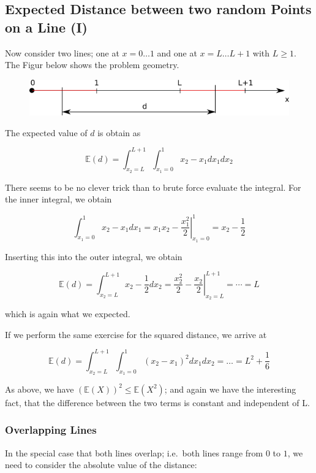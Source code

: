 \subsection{Expected Distance between two random Points on a Line
(I)}\label{expected-distance-between-two-random-points-on-a-line-i}

Now consider two lines; one at \(x=0 \ldots 1\) and one at
\(x=L \ldots L+1\) with \(L \geq 1\). The Figur below shows the problem
geometry.

\begin{figure}[H]
\centering
\includegraphics[scale=0.7]{images/expected_distances_01_02.png}
\end{figure}

The expected value of \(d\) is obtain as

\[
\mathbb{E}(d) = \int_{x_2=L}^{L+1} \int_{x_1=0}^{1} x_2 - x_1 dx_1 dx_2
\]

There seems to be no clever trick than to brute force evaluate the
integral. For the inner integral, we obtain

\[
\int_{x_1=0}^{1} x_2 - x_1 dx_1 = \left. x_1 x_2 - \frac{x_1^2}{2} \right|_{x_1=0}^1 = x_2 - \frac{1}{2}
\]

Inserting this into the outer integral, we obtain

\[
\mathbb{E}(d) = \int_{x_2=L}^{L+1} x_2 - \frac{1}{2} dx_2 = \left. \frac{x_2^2}{2} - \frac{x_2}{2} \right|_{x_2=L}^{L+1} = \cdots = L
\]

which is again what we expected.

If we perform the same exercise for the squared distance, we arrive at

\[
\mathbb{E}(d) = \int_{x_2=L}^{L+1} \int_{x_1=0}^{1} (x_2 - x_1)^2 dx_1 dx_2 = \ldots = L^2 + \frac{1}{6}
\]

As above, we have \((\mathbb{E}(X))^2 \leq \mathbb{E}(X^2)\); and again
we have the interesting fact, that the difference between the two terms
is constant and independent of L.

\subsubsection{Overlapping Lines}

In the special case that both lines overlap; i.e.~both lines range from
\(0\) to \(1\), we need to consider the absolute value of the distance:

